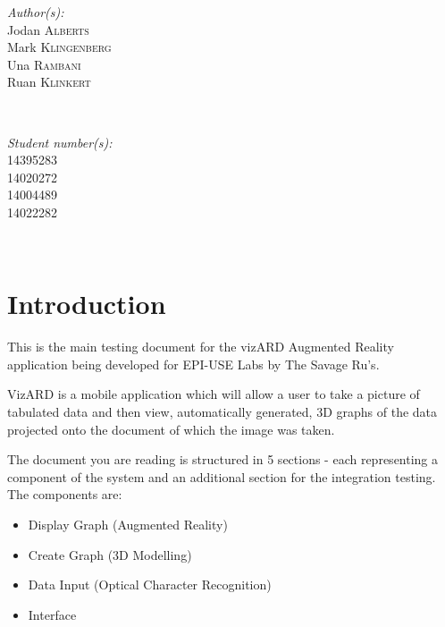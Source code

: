 \documentclass[a4paper,12pt]{article}
\begin{document}
\begin{titlepage}
\begin{minipage}{0.4\textwidth}
\begin{flushleft} \large
\emph{Author(s):}\\
Jodan \textsc{Alberts}\\ %
Mark \textsc{Klingenberg}\\
Una \textsc{Rambani}\\
Ruan \textsc{Klinkert}\\
\end{flushleft}
\end{minipage}
~
\begin{minipage}{0.4\textwidth}
\begin{flushright} \large
\emph{Student number(s):} \\
14395283\\ %
14020272\\
14004489\\
14022282\\

\end{flushright}
\end{minipage}\\[4cm]


 

\vfill %

\end{titlepage}

\newpage

\tableofcontents

\newpage

\section{Introduction}

This is the main testing document for the vizARD Augmented Reality application being developed for EPI-USE Labs by The Savage Ru's.

VizARD is a mobile application which will allow a user to take a picture of tabulated data and then view, automatically generated, 3D graphs of the data projected onto the document of which the image was taken.

The document you are reading is structured in 5 sections - each representing a component of the system and an additional section for the integration testing.
The components are:
\begin{itemize}
\item Display Graph (Augmented Reality)
\item Create Graph (3D Modelling)
\item Data Input (Optical Character Recognition)
\item Interface
\end{itemize}
\end{document}
